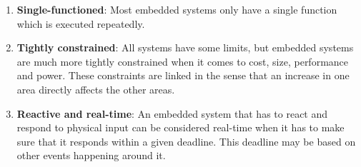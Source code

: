 \begin{enumerate}
  \item \textbf{Single-functioned}:  Most embedded systems only have a single
  function which is executed repeatedly.
  \item \textbf{Tightly constrained}: All systems have some limits, but
  embedded systems are much more tightly constrained when it comes to cost,
  size, performance and power. These constraints are linked in the sense that
  an increase in one area directly affects the other areas.
  \item \textbf{Reactive and real-time}: An embedded system that has to react
  and respond to physical input can be considered real-time when it has to make
  sure that it responds within a given deadline. This deadline may be based on
  other events happening around it.
\end{enumerate}
